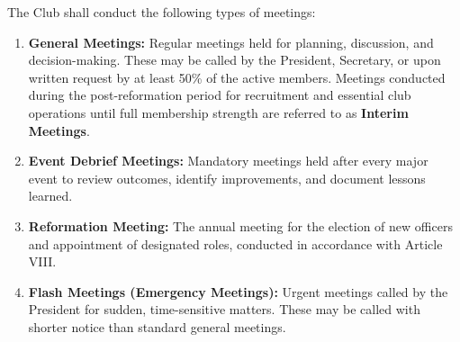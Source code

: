 

The Club shall conduct the following types of meetings:

\begin{enumerate}[label=\alph*), leftmargin=2em, itemsep=0.3em]
    \item \textbf{General Meetings:} Regular meetings held for planning, discussion, and decision-making. These may be called by the President, Secretary, or upon written request by at least 50\% of the active members. Meetings conducted during the post-reformation period for recruitment and essential club operations until full membership strength are referred to as \textbf{Interim Meetings}.
    
    \item \textbf{Event Debrief Meetings:} Mandatory meetings held after every major event to review outcomes, identify improvements, and document lessons learned.
    
    \item \textbf{Reformation Meeting:} The annual meeting for the election of new officers and appointment of designated roles, conducted in accordance with Article VIII.
    
    \item \textbf{Flash Meetings (Emergency Meetings):} Urgent meetings called by the President for sudden, time-sensitive matters. These may be called with shorter notice than standard general meetings.
\end{enumerate}


